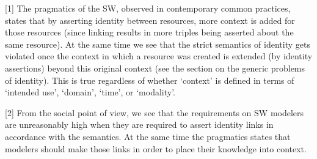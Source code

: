 [1] The pragmatics of the SW, observed in contemporary common practices,
  states that by asserting identity between resources,
  more context is added for those resources
  (since linking results in more triples being asserted
  about the same resource).
At the same time we see that the strict semantics of identity
  gets violated once the context in which a resource was created
  is extended (by identity assertions) beyond this original context
  (see the section on the generic problems of identity).
This is true regardless of whether `context' is defined in terms of
  `intended use', `domain', `time', or `modality'.

[2] From the social point of view,
  we see that the requirements on SW modelers
  are unreasonably high when they are required to
  assert identity links in accordance with the semantics.
At the same time the pragmatics states that modelers should
  make those links in order to place their knowledge into context.

